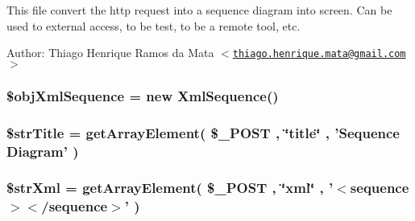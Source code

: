 This file convert the http request into a sequence diagram into screen. Can be used to external access, to be test, to be a remote tool, etc.

\begin{Desc}
\item[Author:]Thiago Henrique Ramos da Mata $<$\href{mailto:thiago.henrique.mata@gmail.com}{\tt thiago.henrique.mata@gmail.com}$>$ \end{Desc}
\hypertarget{sequence_8php_eefa469c1b13fe1fec040c910b720034}{
\subsubsection[{\$objXmlSequence}]{\setlength{\rightskip}{0pt plus 5cm}\$objXmlSequence = new {\bf XmlSequence}()}}
\label{sequence_8php_eefa469c1b13fe1fec040c910b720034}


\hypertarget{sequence_8php_e5059171a0a3647786809cd168a41c0f}{
\subsubsection[{\$strTitle}]{\setlength{\rightskip}{0pt plus 5cm}\$strTitle = getArrayElement( \$\_\-POST , \char`\"{}title\char`\"{} , 'Sequence Diagram' )}}
\label{sequence_8php_e5059171a0a3647786809cd168a41c0f}


\hypertarget{sequence_8php_2651e3074f6303e4683f2aff16ec1fbd}{
\subsubsection[{\$strXml}]{\setlength{\rightskip}{0pt plus 5cm}\$strXml = getArrayElement( \$\_\-POST , \char`\"{}xml\char`\"{} , '$<$sequence$>$$<$/sequence$>$' )}}
\label{sequence_8php_2651e3074f6303e4683f2aff16ec1fbd}


